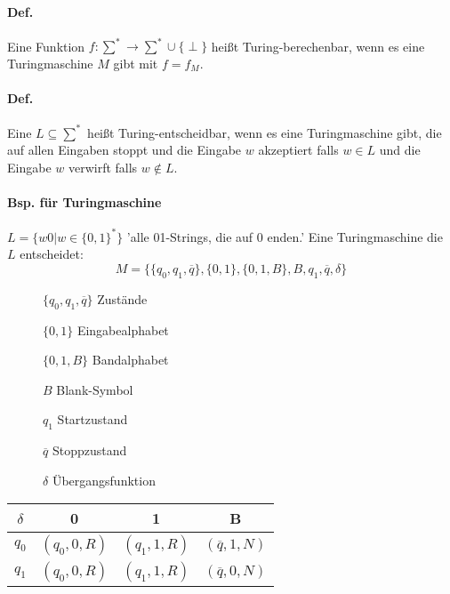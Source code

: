 \paragraph*{Def.} Eine Funktion $f:\sum^* \rightarrow\sum^* \cup \{ \perp \}$ heißt Turing-berechenbar, wenn es eine Turingmaschine $M$ gibt mit $f=f_M$.



\paragraph*{Def.} Eine $L \subseteq \sum^*$ heißt Turing-entscheidbar, wenn es eine Turingmaschine gibt, die auf allen Eingaben stoppt und die Eingabe $w$ akzeptiert falls $w \in L$ und die Eingabe $w$ verwirft falls $w \not\in L$.

\paragraph*{Bsp. für Turingmaschine} $L=\{ w0|w \in \{ 0,1 \}^* \}$ 'alle 01-Strings, die auf 0 enden.' Eine Turingmaschine die $L$ entscheidet: $$ M=\{ \{q_0,q_1,\overline{q}\}, \{0,1\}, \{0,1,B\}, B, q_1, \overline{q}, \delta \} $$
\begin{description}
	\item[] $\{q_0,q_1,\overline{q}\}$ Zustände
	\item[] $\{0,1\}$ Eingabealphabet
	\item[] $\{0,1,B\}$ Bandalphabet
	\item[] $B$ Blank-Symbol
	\item[] $q_1$ Startzustand
	\item[] $\overline{q}$ Stoppzustand
	\item[] $\delta$ Übergangsfunktion
\end{description}

\begin{table}[htb!]
\centering
\begin{tabular}{c|c c c}
$\delta$ & 0 & 1 & B \\
\hline 
$q_0$ & $(q_0,0,R)$ & $(q_1,1,R)$ & $(\overline{q},1,N)$ \\
$q_1$ & $(q_0,0,R)$ & $(q_1,1,R)$ & $(\overline{q},0,N)$ \\
\end{tabular}
\end{table}

